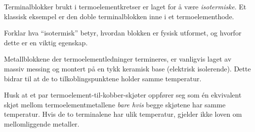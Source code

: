 
Terminalblokker brukt i termoelementkretser er laget for å være {\it isotermiske}. Et klassisk eksempel er den doble terminalblokken inne i et termoelementhode.

Forklar hva ``isotermisk'' betyr, hvordan blokken er fysisk utformet, og hvorfor dette er en viktig egenskap.







Metallblokkene der termoelementledninger termineres, er vanligvis laget av massiv messing og montert på en tykk keramisk base (elektrisk isolerende). Dette bidrar til at de to tilkoblingspunktene holder samme temperatur.







Husk at et par termoelement-til-kobber-skjøter oppfører seg som én ekvivalent skjøt mellom termoelementmetallene {\it bare hvis} begge skjøtene har samme temperatur. Hvis de to terminalene har ulik temperatur, gjelder ikke loven om mellomliggende metaller.


